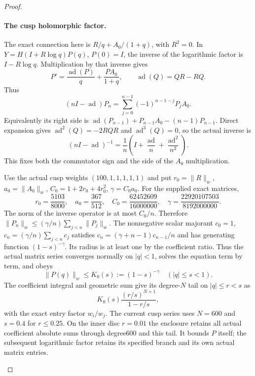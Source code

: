 \begin{proof}
\begin{enumerate}[label=\arabic*.]
\paragraph{The cusp holomorphic factor.}
The exact connection here is
$R/q+A_0/(1+q)$, with $R^2=0$. In
$Y=H(I+R\log q)P(q)$, $P(0)=I$, the inverse of the logarithmic
factor is $I-R\log q$. Multiplication by that inverse gives
\[
 P'=\frac{\operatorname{ad}(P)}q+\frac{PA_0}{1+q},
 \qquad\operatorname{ad}(Q)=QR-RQ.
\]
Thus
\[
 (nI-\operatorname{ad})P_n
  =\sum_{j=0}^{n-1}(-1)^{n-1-j}P_jA_0.
\]
Equivalently its right side is
$\operatorname{ad}(P_{n-1})+P_{n-1}A_0-(n-1)P_{n-1}$.
Direct expansion gives
$\operatorname{ad}^2(Q)=-2RQR$ and
$\operatorname{ad}^3(Q)=0$, so the actual inverse is
\[
 (nI-\operatorname{ad})^{-1}
  =\frac1n\left(I+\frac{\operatorname{ad}}n
                   +\frac{\operatorname{ad}^2}{n^2}\right).
\]
This fixes both the commutator sign and the side of the $A_0$
multiplication.

Use the actual cusp weights $(100,1,1,1,1,1)$ and put
$r_0=\|R\|_w$, $a_0=\|A_0\|_w$,
$C_0=1+2r_0+4r_0^2$, $\gamma=C_0a_0$. For the supplied exact
matrices,
\[
 r_0=\frac{5103}{8000},\quad a_0=\frac{367}{512},\quad
 C_0=\frac{62452609}{16000000},\quad
 \gamma=\frac{22920107503}{8192000000}.
\]
The norm of the inverse operator is at most $C_0/n$. Therefore
$\|P_n\|_w\le(\gamma/n)\sum_{j<n}\|P_j\|_w$.
The nonnegative scalar majorant $c_0=1$,
$c_n=(\gamma/n)\sum_{j<n}c_j$ satisfies
$c_n=(\gamma+n-1)c_{n-1}/n$ and has generating function
$(1-s)^{-\gamma}$. Its radius is at least one by the coefficient
ratio. Thus the actual matrix series converges normally on
$|q|<1$, solves the equation term by term, and obeys
\[
 \|P(q)\|_w\le K_0(s):=(1-s)^{-\gamma}\quad(|q|\le s<1).
\]
The coefficient integral and geometric sum give its degree-$N$
tail on $|q|\le r<s$ as
\[
 K_0(s)\frac{(r/s)^{N+1}}{1-r/s},
\]
with the exact entry factor $w_i/w_j$. The current cusp series
uses $N=600$ and $s=0.4$ for $r\le0.25$. On the inner disc
$r=0.01$ the enclosure retains all actual coefficient absolute
sums through degree600 and this tail. It bounds $P$ itself;
the subsequent logarithmic factor retains its specified branch
and its own actual matrix entries.


\end{enumerate}
\end{proof}
